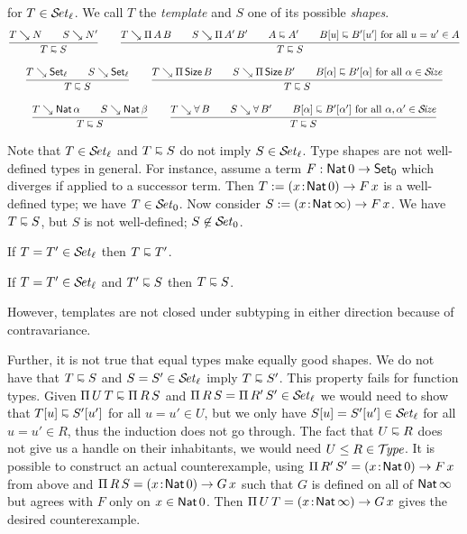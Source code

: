 \documentclass[acmlarge,review,anonymous]{acmart}\settopmatter{printfolios=true}
\begin{document}
 for $T \in \SET[\ell]$.  We call $T$ the \emph{template} and $S$ one of its possible \emph{shapes}.
\begin{gather*}
  \ru{T \evalsto N \qquad
      S \evalsto N'
    }{T \shape S}
\qquad
  \ru{T \evalsto \piT A B \qquad
      S \evalsto \piT{A'}{B'} \qquad
      A \shape A' \qquad
      B[u] \shape B'[u'] \mforall u = u' \in A
    }{T \shape S}
\\[2ex]
   \ru{T \evalsto \Set[\ell] \qquad
       S \evalsto \Set[\ell]
    }{T \shape S}
\qquad
  \ru{T \evalsto \piT \Size B \qquad
      S \evalsto \piT{\Size}{B'} \qquad
      B[\alpha] \shape B'[\alpha] \mforall \alpha \in \SIZE
    }{T \shape S}
\\[2ex]
  \ru{T \evalsto \Nat \alpha \qquad
      S \evalsto \Nat \beta
    }{T \shape S}
\qquad
  \ru{T \evalsto \forallT B \qquad
      S \evalsto \forallT{B'} \qquad
      B[\alpha] \shape B'[\alpha'] \mforall \alpha,\alpha' \in \SIZE
    }{T \shape S}
\end{gather*}

Note that $T \in \SET[\ell]$ and $T \shape S$ do not imply $S \in \SET[\ell]$.
Type shapes are not well-defined types in general.
For instance, assume a term $F : \Nat 0 \to \Set[0]$ which diverges if applied to a successor term.
Then $T := \funT x {\Nat 0} {F\,x}$ is a well-defined type; we have $T \in \SET[0]$.
Now consider $S := \funT x {\Nat \infty} {F\,x}$.
We have $T \shape S$, but $S$ is not well-defined; $S \not\in \SET[0]$.

\begin{lemma}
  If\/ $T = T' \in \SET[\ell]$ then $T \shape T'$.
\end{lemma}

\begin{lemma}
  If\/ $T = T' \in \SET[\ell]$ and $T' \shape S$ then $T \shape S$.
\end{lemma}

However, templates are not closed under subtyping in either direction because of contravariance.

Further, it is not true that equal types make equally good shapes.  We do not have that
$T \shape S$ and $S = S' \in \SET[\ell]$ imply $T \shape S'$.  This property fails for function types.
Given $\piT U T \shape \piT R S$ and $\piT R S = \piT {R'}{S'} \in \SET[\ell]$ we would need to show that $T[u] \shape S'[u']$ for all $u = u' \in U$, but we only have $S[u] = S'[u'] \in \SET[\ell]$ for all $u = u' \in R$, thus the induction does not go through.  The fact that $U \shape R$ does not give us a handle on their inhabitants, we would need $U \leq R \in \TYPE$.
It is possible to construct an actual counterexample, using
$\piT {R'} S' =  \funT x {\Nat 0} {F\,x}$ from above and $\piT R S = \funT x {\Nat 0} {G\,x}$
such that $G$ is defined on all of $\Nat \infty$ but agrees with $F$ only on $x \in \Nat 0$.
Then $\piT U T = \funT x {\Nat \infty} {G\,x}$ gives the desired counterexample.
\end{document}
